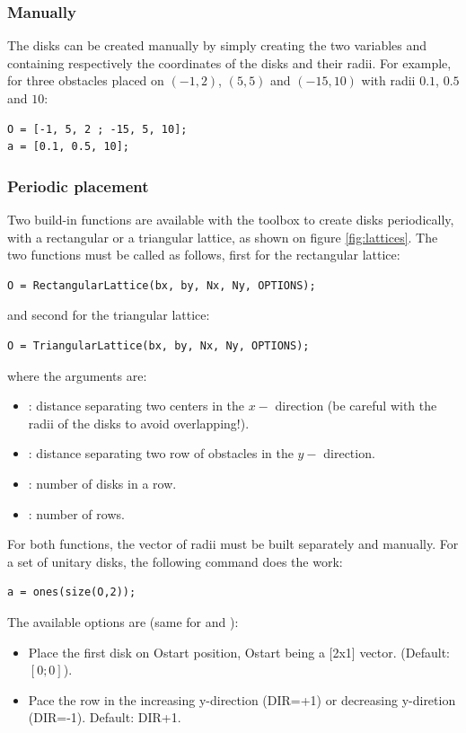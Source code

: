 \subsubsection{Manually}

The disks can be created manually by simply creating the two variables  and  containing respectively the coordinates of the disks and their radii. For example, for three obstacles placed on $(-1,2)$, $(5,5)$ and $(-15,10)$ with radii $0.1$, $0.5$ and $10$:
\begin{lstlisting}
O = [-1, 5, 2 ; -15, 5, 10];
a = [0.1, 0.5, 10];
\end{lstlisting}

\subsubsection{Periodic placement}

Two build-in functions are available with the toolbox to create disks periodically, with a rectangular or a triangular lattice, as shown on figure \ref{fig:lattices}. The two functions must be called as follows, first for the rectangular lattice:
\begin{lstlisting}
O = RectangularLattice(bx, by, Nx, Ny, OPTIONS);
\end{lstlisting}
and second for the triangular lattice:
\begin{lstlisting}
O = TriangularLattice(bx, by, Nx, Ny, OPTIONS);
\end{lstlisting}
where the arguments are:
\begin{itemize}
\item {}: distance separating two centers in the $x-$ direction (be careful with the radii of the disks to avoid overlapping!).
\item {}: distance separating two row of obstacles in the $y-$ direction.
\item {}: number of disks in a row.
\item {}: number of rows.
\end{itemize}
For both functions, the vector of radii must be built separately and manually. For a set of unitary disks, the following command does the work:
\begin{lstlisting}
a = ones(size(O,2));
\end{lstlisting}

The available options are (same for  and ):
\begin{itemize}
\item {}
Place the first disk on Ostart position, Ostart being a [2x1] vector. (Default: $[0;0]$).
 \item {}
Pace the row in the increasing y-direction (DIR=+1) or decreasing y-diretion (DIR=-1). Default: DIR+1.
\end{itemize}

